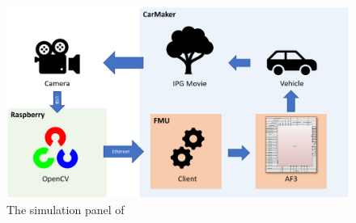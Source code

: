 \begin{figure}[!h]
	\centering
	\includegraphics[width=1\textwidth]{./img/lk_concept.png}
	\caption{The simulation panel of \af}
	\label{fig:simulation}
\end{figure}


